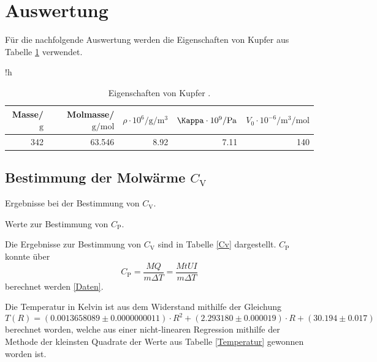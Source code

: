 \newpage
\section{Auswertung} %
\label{sec:auswertung}

Für die nachfolgende Auswertung werden die Eigenschaften von Kupfer aus Tabelle \ref{Eigenschaften} verwendet.

\begin{table}{!h}
	\centering
	\caption[]{Eigenschaften von Kupfer \cite{kupfer1}\cite{kupfer2}.}
	\begin{tabular}{rrrrr}
		\toprule
		Masse/$\si{\gram}$ & Molmasse/$\si{\gram\per\mol}$ & $\rho \cdot 10^6/\si{\gram\per\meter^3}$ & $\Kappa \cdot 10^9/\si{\pascal}$ & $V_0 \cdot 10^{-6}/\si{\meter^3\per\mol}$\\
		\midrule
		342 & 63.546 & 8.92 & 7.11 & 140\\
		\bottomrule
	\end{tabular}
	\label{Eigenschaften}
\end{table}

\FloatBarrier
\subsection{Bestimmung der Molwärme $C_\mathrm{V}$} %
\label{sub:bestimmung_von_c__mathrm}

\begin{table}[!h]
	\caption[]{Ergebnisse bei der Bestimmung von $C_\mathrm{V}$.}
	\centering
	
	\label{Cv}
\end{table}

\begin{table}[!h]
	\centering
	\caption[]{Werte zur Bestimmung von $C_\mathrm{P}$.}
	
	\label{Daten}
\end{table}

Die Ergebnisse zur Bestimmung von $C_\mathrm{V}$ sind in Tabelle \ref{Cv} dargestellt.
$C_\mathrm{P}$ konnte über
\begin{equation*}
	C_\mathrm{P} = \frac{M Q}{m \Delta T} = \frac{M t U I}{m \Delta T}
\end{equation*}
berechnet werden \ref{Daten}.

Die Temperatur in Kelvin ist aus dem Widerstand mithilfe der Gleichung
\begin{equation*}
	T(R) = (0.0013658089 \pm 0.0000000011) \cdot R^2 + (2.293180 \pm 0.000019) \cdot R + (30.194 \pm 0.017)
\end{equation*}
berechnet worden, welche aus einer nicht-linearen Regression mithilfe der Methode der kleinsten Quadrate der Werte aus Tabelle \ref{Temperatur} gewonnen worden ist.


